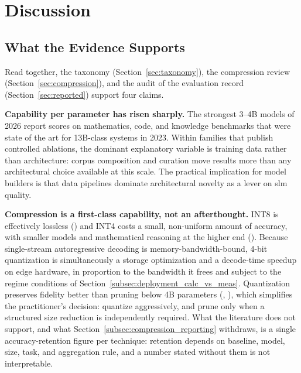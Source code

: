 \section{Discussion}
\label{section:discussion}

\subsection{What the Evidence Supports}
\label{subsec:discussion_key_findings}

Read together, the taxonomy (Section~\ref{sec:taxonomy}), the compression review
(Section~\ref{sec:compression}), and the audit of the evaluation record
(Section~\ref{sec:reported}) support four claims.

\textbf{Capability per parameter has risen sharply.} The strongest 3--4B models
of 2026 report scores on mathematics, code, and knowledge benchmarks that were
state of the art for 13B-class systems in 2023. Within families that publish
controlled ablations, the dominant explanatory variable is training data rather
than architecture: corpus composition and curation move results more than any
architectural choice available at this scale. The practical implication for model
builders is that data pipelines dominate architectural novelty as a lever on
\gls{slm} quality.

\textbf{Compression is a first-class capability, not an afterthought.} INT8 is
effectively lossless (\evB) and INT4 costs a small, non-uniform amount of
accuracy, with smaller models and mathematical reasoning at the higher end
(\evC). Because single-stream autoregressive decoding is memory-bandwidth-bound,
4-bit quantization is simultaneously a storage optimization and a decode-time
speedup on edge hardware, in proportion to the bandwidth it frees and subject to
the regime conditions of Section~\ref{subsec:deployment_calc_vs_meas}.
Quantization preserves fidelity better than pruning below 4B parameters
(\evB, \citealp{kurz2025pruning_vs_quant}), which simplifies the practitioner's
decision: quantize aggressively, and prune only when a structured size reduction
is independently required. What the literature does not support, and what
Section~\ref{subsec:compression_reporting} withdraws, is a single accuracy-retention
figure per technique: retention depends on baseline, model, size, task, and
aggregation rule, and a number stated without them is not interpretable.

